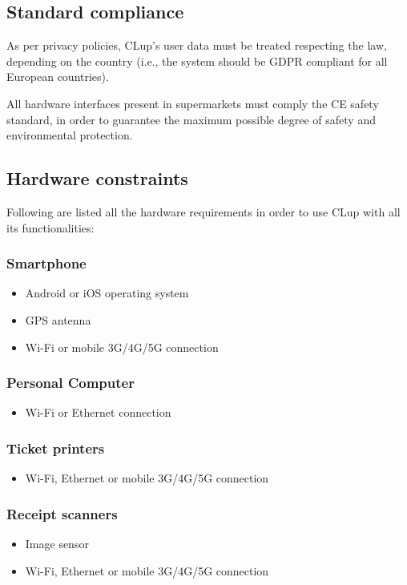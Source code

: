 \documentclass[../../main.tex]{subfiles}
\begin{document}
	\subsection{Standard compliance}

	As per privacy policies, CLup's user data must be treated respecting the law, depending on the 
	country (i.e., the system should be GDPR compliant for all European countries).

	All hardware interfaces present in supermarkets must comply the CE safety standard, in order to guarantee 
	the maximum possible degree of safety and environmental protection.

	\subsection{Hardware constraints}

	Following are listed all the hardware requirements in order to use CLup with all its functionalities:

	\subsubsection*{Smartphone}
	\begin{itemize}

		\item Android or iOS operating system

		\item GPS antenna

		\item Wi-Fi or mobile 3G/4G/5G connection

	\end{itemize}

	\subsubsection*{Personal Computer}
	\begin{itemize}

		\item Wi-Fi or Ethernet connection

	\end{itemize}

	\subsubsection*{Ticket printers}
	\begin{itemize}

		\item Wi-Fi, Ethernet or mobile 3G/4G/5G connection

	\end{itemize}

	\subsubsection*{Receipt scanners}
	\begin{itemize}

		\item Image sensor

		\item Wi-Fi, Ethernet or mobile 3G/4G/5G connection

	\end{itemize}
	
\end{document}
